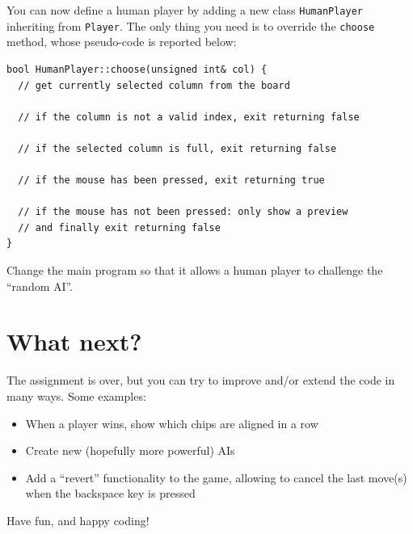 \documentclass{article}
\begin{document}
You can now define a human player by adding a new class \texttt{HumanPlayer} inheriting from \texttt{Player}. The only thing you need is to override the \texttt{choose} method, whose pseudo-code is reported below:
\begin{lstlisting}[style=mycpp,numbers=none]
bool HumanPlayer::choose(unsigned int& col) {
  // get currently selected column from the board
  
  // if the column is not a valid index, exit returning false
  
  // if the selected column is full, exit returning false
  
  // if the mouse has been pressed, exit returning true
  
  // if the mouse has not been pressed: only show a preview
  // and finally exit returning false
}
\end{lstlisting}

Change the main program so that it allows a human player to challenge the ``random AI''.


\section*{What next?}

The assignment is over, but you can try to improve and/or extend the code in many ways. Some examples:
\begin{itemize}
  \item When a player wins, show which chips are aligned in a row
  \item Create new (hopefully more powerful) AIs
  \item Add a ``revert'' functionality to the game, allowing to cancel the last move(s) when the backspace key is pressed
\end{itemize}

Have fun, and happy coding!
\end{document}
